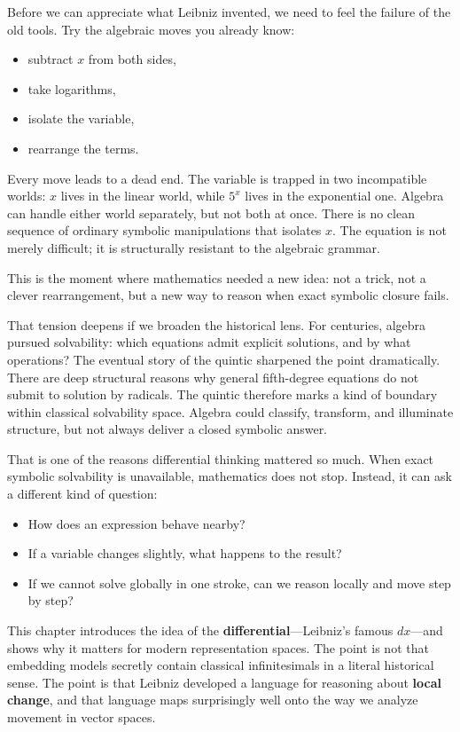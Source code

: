 Before we can appreciate what Leibniz invented, we need to feel the
failure of the old tools. Try the algebraic moves you already know:

\begin{itemize}
\tightlist
\item
  subtract \(x\) from both sides,
\item
  take logarithms,
\item
  isolate the variable,
\item
  rearrange the terms.
\end{itemize}

Every move leads to a dead end. The variable is trapped in two
incompatible worlds: \(x\) lives in the linear world, while \(5^x\)
lives in the exponential one. Algebra can handle either world
separately, but not both at once. There is no clean sequence of ordinary
symbolic manipulations that isolates \(x\). The equation is not merely
difficult; it is structurally resistant to the algebraic grammar.

This is the moment where mathematics needed a new idea: not a trick, not
a clever rearrangement, but a new way to reason when exact symbolic
closure fails.

That tension deepens if we broaden the historical lens. For centuries,
algebra pursued solvability: which equations admit explicit solutions,
and by what operations? The eventual story of the quintic sharpened the
point dramatically. There are deep structural reasons why general
fifth-degree equations do not submit to solution by radicals. The
quintic therefore marks a kind of boundary within classical solvability
space. Algebra could classify, transform, and illuminate structure, but
not always deliver a closed symbolic answer.

That is one of the reasons differential thinking mattered so much. When
exact symbolic solvability is unavailable, mathematics does not stop.
Instead, it can ask a different kind of question:

\begin{itemize}
\tightlist
\item
  How does an expression behave nearby?
\item
  If a variable changes slightly, what happens to the result?
\item
  If we cannot solve globally in one stroke, can we reason locally and
  move step by step?
\end{itemize}

This chapter introduces the idea of the
\textbf{differential}---Leibniz's famous \(dx\)---and shows why it
matters for modern representation spaces. The point is not that
embedding models secretly contain classical infinitesimals in a literal
historical sense. The point is that Leibniz developed a language for
reasoning about \textbf{local change}, and that language maps
surprisingly well onto the way we analyze movement in vector spaces.

